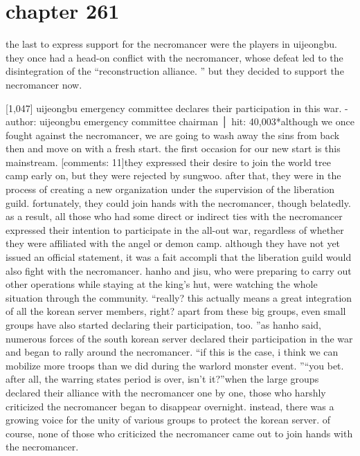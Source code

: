 \section{chapter 261}

                            the last to express support for the necromancer were the players in uijeongbu.
 they once had a head-on conflict with the necromancer, whose defeat led to the disintegration of the “reconstruction alliance.
” but they decided to support the necromancer now.





[1,047] uijeongbu emergency committee declares their participation in this war.
-author: uijeongbu emergency committee chairman │ hit: 40,003*although we once fought against the necromancer, we are going to wash away the sins from back then and move on with a fresh start.
 the first occasion for our new start is this mainstream.
[comments: 11]they expressed their desire to join the world tree camp early on, but they were rejected by sungwoo.
 after that, they were in the process of creating a new organization under the supervision of the liberation guild.
 fortunately, they could join hands with the necromancer, though belatedly.
as a result, all those who had some direct or indirect ties with the necromancer expressed their intention to participate in the all-out war, regardless of whether they were affiliated with the angel or demon camp.
although they have not yet issued an official statement, it was a fait accompli that the liberation guild would also fight with the necromancer.
hanho and jisu, who were preparing to carry out other operations while staying at the king’s hut, were watching the whole situation through the community.
“really? this actually means a great integration of all the korean server members, right? apart from these big groups, even small groups have also started declaring their participation, too.
”as hanho said, numerous forces of the south korean server declared their participation in the war and began to rally around the necromancer.
“if this is the case, i think we can mobilize more troops than we did during the warlord monster event.
”“you bet.
 after all, the warring states period is over, isn’t it?”when the large groups declared their alliance with the necromancer one by one, those who harshly criticized the necromancer began to disappear overnight.
 instead, there was a growing voice for the unity of various groups to protect the korean server.
of course, none of those who criticized the necromancer came out to join hands with the necromancer.
